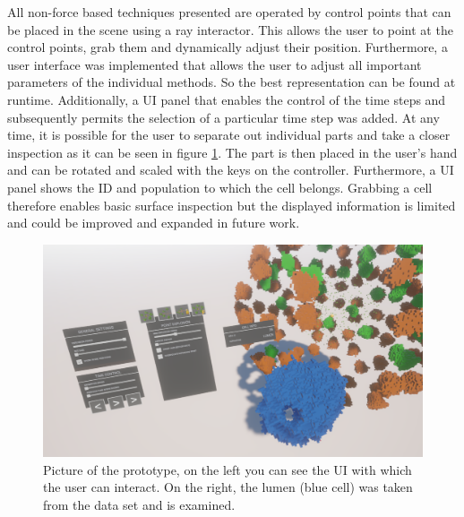 All non-force based techniques presented are operated by control points that can be placed in the scene using a ray interactor. 
This allows the user to point at the control points, grab them and dynamically adjust their position.
Furthermore, a user interface was implemented that allows the user to adjust all important parameters of the individual methods. 
So the best representation can be found at runtime.  
Additionally, a UI panel that enables the control of the time steps and subsequently permits the selection of a particular time step was added.
At any time, it is possible for the user to separate out individual parts and take a closer inspection as it can be seen in figure \ref{fig:Interaction}. 
The part is then placed in the user's hand and can be rotated and scaled with the keys on the controller. Furthermore, a UI panel shows the ID and population to which the cell belongs. 
Grabbing a cell therefore enables basic surface inspection but the displayed information is limited and could be improved and expanded in future work. 
\begin{figure}[h]
	\centering
	\includegraphics[width=1\linewidth]{fig/Images/Interaction}
	\caption[]{Picture of the prototype, on the left you can see the UI with which the user can interact. On the right, the lumen (blue cell) was taken from the data set and is examined. }
	\label{fig:Interaction}
\end{figure}




